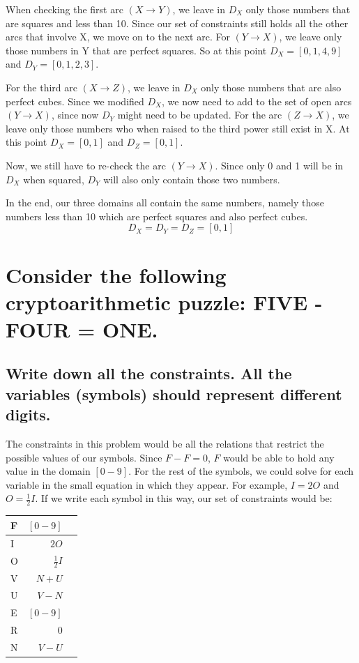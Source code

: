 \documentclass{article}
\begin{document}
	When checking the first arc $(X\rightarrow Y)$, we leave in $D_{X}$ only those numbers that are squares and
	less than 10. Since our set of constraints still holds all the other arcs that involve X, we move on to the 
	next arc. For $(Y\rightarrow X)$, we leave only those numbers in Y that are perfect squares. So at this 
	point $D_{X}=[0,1,4,9]$ and $D_{Y}=[0,1,2,3]$. 

	For the third arc $(X\rightarrow Z)$, we leave in $D_{X}$ only those numbers that are also perfect cubes. 
	Since we modified $D_{X}$, we now need to add to the set of open arcs $(Y\rightarrow X)$, since now $D_{Y}$
	might need to be updated. For the arc $(Z\rightarrow X)$, we leave only those numbers who when raised 
	to the third power still exist in X. At this point $D_{X}=[0,1]$ and $D_{Z}=[0,1]$. 

	Now, we still have to re-check the arc $(Y\rightarrow X)$. Since only 0 and 1 will be in $D_{X}$ when 
	squared, $D_{Y}$ will also only contain those two numbers. 

	In the end, our three domains all contain the same numbers, namely those numbers less than 10 which are 
	perfect squares and also perfect cubes. 
	\[ D_{X} = D_{Y} = D_{Z} = [0,1]\]

\section{Consider the following cryptoarithmetic puzzle: FIVE - FOUR = ONE.}
	\subsection{Write down all the constraints. All the variables (symbols) should represent different digits.}
	The constraints in this problem would be all the relations that restrict the possible values of our symbols.
	Since $F - F = 0$, $F$ would be able to hold any value in the domain $[0-9]$. For the rest of the symbols,
	we could solve for each variable in the small equation in which they appear. For example, $I= 2O$ and 
	$O = \frac{1}{2}I$. If we write each symbol in this way, our set of constraints would be:
	\begin{center}
		\begin{tabular}{|l | r | c |}
			\hline
				F  & $[0-9]$ \\ \hline
				I  & $2O$\\ \hline
				O  & $\frac{1}{2}I$\\ \hline
				V  & $N + U$\\ \hline
				U  & $V - N$\\ \hline
				E  & $[0-9]$\\ \hline
				R  & $0$ \\ \hline
				N  & $V - U$\\ 
			\hline
		\end{tabular}	
	\end{center}
\end{document}
